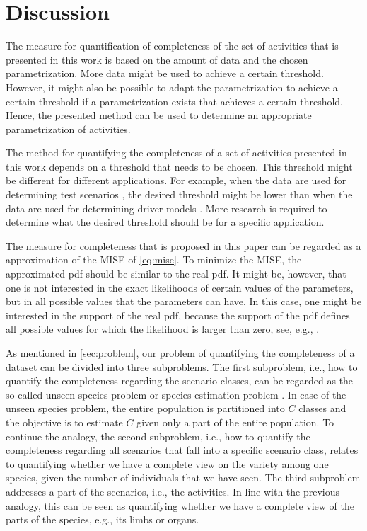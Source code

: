 \section{Discussion}
\label{sec:discussion}

The measure for quantification of completeness of the set of activities that is presented in this work is based on the amount of data and the chosen parametrization. More data might be used to achieve a certain threshold. However, it might also be possible to adapt the parametrization to achieve a certain threshold if a parametrization exists that achieves a certain threshold. Hence, the presented method can be used to determine an appropriate parametrization of activities.

The method for quantifying the completeness of a set of activities presented in this work depends on a threshold that needs to be chosen. This threshold might be different for different applications. For example, when the data are used for determining test scenarios \cite{elrofai2018scenario, ploeg2018cetran}, the desired threshold might be lower than when the data are used for determining driver models \cite{wang2017much, sadigh2014data}. More research is required to determine what the desired threshold should be for a specific application.

The measure for completeness that is proposed in this paper can be regarded as a approximation of the MISE of \cref{eq:mise}. To minimize the MISE, the approximated pdf should be similar to the real pdf. It might be, however, that one is not interested in the exact likelihoods of certain values of the parameters, but in all possible values that the parameters can have. In this case, one might be interested in the support of the real pdf, because the support of the pdf defines all possible values for which the likelihood is larger than zero, see, e.g., \textcite{scholkopf2001estimating}.

As mentioned in \cref{sec:problem}, our problem of quantifying the completeness of a dataset can be divided into three subproblems. The first subproblem, i.e., how to quantify the completeness regarding the scenario classes, can be regarded as the so-called unseen species problem \cite{bunge1993estimating, gandolfi2004nonparametric} or species estimation problem \cite{yang2012estimating}. In case of the unseen species problem, the entire population is partitioned into $C$ classes and the objective is to estimate $C$ given only a part of the entire population. To continue the analogy, the second subproblem, i.e., how to quantify the completeness regarding all scenarios that fall into a specific scenario class, relates to quantifying whether we have a complete view on the variety among one species, given the number of individuals that we have seen. The third subproblem addresses a part of the scenarios, i.e., the activities. In line with the previous analogy, this can be seen as quantifying whether we have a complete view of the parts of the species, e.g., its limbs or organs.

